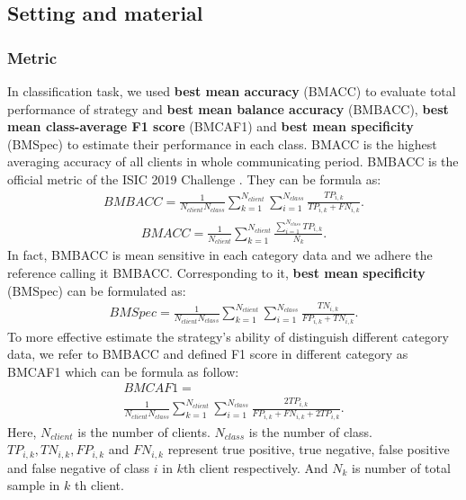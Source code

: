 \documentclass[journal]{IEEEtran}
\begin{document}
\subsection{Setting and material}

\subsubsection{\textbf{Metric}}
In classification task, we used \textbf{best mean accuracy} (BMACC)\cite{Huang2020PersonalizedCF} to evaluate total performance of strategy and \textbf{best mean balance accuracy} (BMBACC), \textbf{best mean class-average F1 score} (BMCAF1) and \textbf{best mean specificity} (BMSpec) to estimate their performance in each class. BMACC is the highest averaging accuracy of all clients in whole communicating period. BMBACC is the official metric of the ISIC 2019 Challenge \cite{Wu2022FederatedLW}. They can be formula as:
\begin{multline}\label{BMBACC_func}
	BMBACC= 
	\frac{1}{N_{client}N_{class}} \sum_{k=1}^{N_{client}}\sum_{i=1}^{N_{class}}\frac{TP_{i,k}}{TP_{i,k}+FN_{i,k}}.
\end{multline}
\begin{multline}\nonumber
	BMACC= \frac{1}{N_{client}} \sum_{k=1}^{N_{client}}\frac{\sum_{i=1}^{N_{class}}TP_{i,k}}{N_{k}}.
\end{multline}
In fact, BMBACC is mean sensitive in each category data and we adhere the reference \cite{Wu2022FederatedLW} calling it BMBACC. 
Corresponding to it, \textbf{best mean specificity} (BMSpec) can be formulated as:
\begin{multline}\nonumber
	BMSpec= 
	\frac{1}{N_{client}N_{class}} \sum_{k=1}^{N_{client}}\sum_{i=1}^{N_{class}}\frac{TN_{i,k}}{FP_{i,k}+TN_{i,k}}.
\end{multline}
To more effective estimate the strategy's ability of distinguish different category data, we refer to BMBACC and defined F1 score in different category as BMCAF1 which can be formula as follow:
\begin{multline}\nonumber
	BMCAF1= \\
	\frac{1}{N_{client}N_{class}} \sum_{k=1}^{N_{client}}\sum_{i=1}^{N_{class}}\frac{2TP_{i,k}}{FP_{i,k}+FN_{i,k}+2TP_{i,k}}.
\end{multline}
Here, $N_{client}$ is the number of clients. $N_{class}$ is the number of class. $TP_{i,k}, TN_{i,k}, FP_{i,k}$ and $FN_{i,k}$ represent true positive, true negative, false positive and false negative of class $i$ in $k$th client respectively. And $N_{k}$ is number of total sample in $k$ th client.
\end{document}
